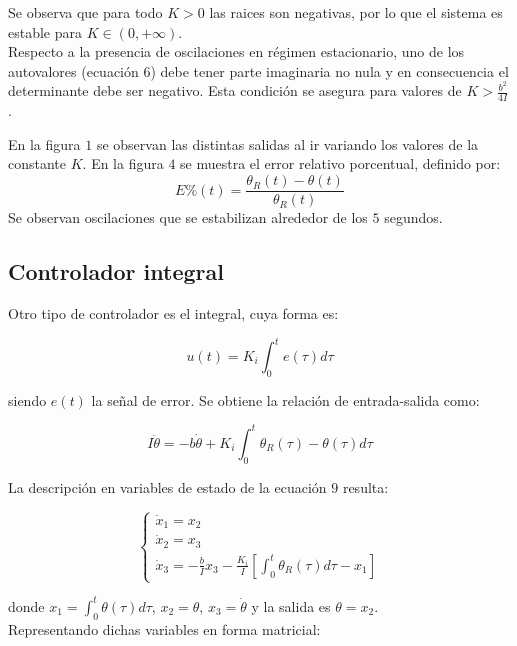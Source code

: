 \documentclass{sig-alternate}
\begin{document}
Se observa que para todo $K > 0$ las raices son negativas, por lo que el sistema 
es estable para $K \in (0,+\infty)$.\\
Respecto a la presencia de oscilaciones en r\'{e}gimen estacionario, uno de los 
autovalores (ecuaci\'on $6$) debe tener parte imaginaria no nula y en 
consecuencia el determinante debe ser negativo. Esta condici\'on se asegura 
para valores de $K > \frac{b^2}{4I}$. 

En la figura $1$ se observan las distintas salidas al ir variando los valores
de la constante $K$. En la figura $4$ se muestra el error relativo porcentual,
definido por:
\begin{equation}
\label{ecuacion_error_relativo_porcentual}
E\%(t)=\frac{\theta_{R}(t) - \theta(t)}{\theta_{R}(t)}
\end{equation}
Se observan oscilaciones que se estabilizan alrededor de los $5$ segundos.

\subsection{Controlador integral}\label{integral}
Otro tipo de controlador es el integral, cuya forma es:

\begin{equation}
\label{error_modelo2}
u(t) = K_i \int_0^t e(\tau) d\tau
\end{equation}

siendo $e(t)$ la se\~nal de error. Se obtiene la relaci\'{o}n de
entrada-salida como:

\begin{equation}
\label{ecuacion_modelo2}
I \ddot\theta = - b \dot\theta + K_i \int_0^t \theta_R(\tau) - \theta(\tau) d\tau
\end{equation}

La descripci\'{o}n en variables de estado de la ecuaci\'on $9$ resulta:

\begin{equation}
\label{var_estados_model2}
\begin{cases} 
    \dot x_1 = x_2 \\
    \dot x_2 = x_3 \\
    \dot x_3 = -\frac{b}{I} x_3 - \frac{K_i}{I} \left[ \int_0^t \theta_R(\tau) d\tau -x_1 \right]
\end{cases}
\end{equation}

donde $x_1 = \int_0^t \theta(\tau) d\tau$, $x_2 = \theta$, $x_3 = \dot \theta$ 
y la salida es $\theta=x_2$.\\
Representando dichas variables en forma matricial:
\end{document}
